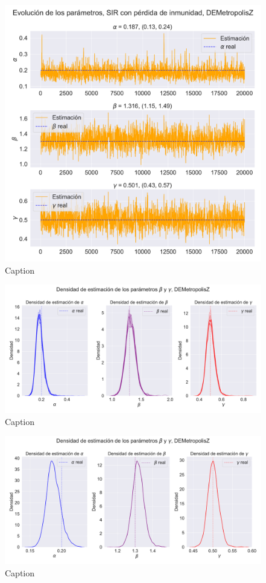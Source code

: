 \begin{figure}[h]
    \centering
    \includegraphics[width=0.8\linewidth]{img/content/chapter4/DEMetropolis_sir_rec_params_trace.pdf}
    \caption{Caption}
    \label{fig:enter-label}
\end{figure}

\begin{figure}[h]
    \centering
    \includegraphics[width=0.8\linewidth]{img/content/chapter4/DEMetropolis_sir_rec_params_density.pdf}
    \caption{Caption}
    \label{fig:enter-label}
\end{figure}

\begin{figure}[h]
    \centering
    \includegraphics[width=0.8\linewidth]{img/content/chapter4/DEMetropolis_sir_rec_params_density_mean.pdf}
    \caption{Caption}
    \label{fig:enter-label}
\end{figure}

